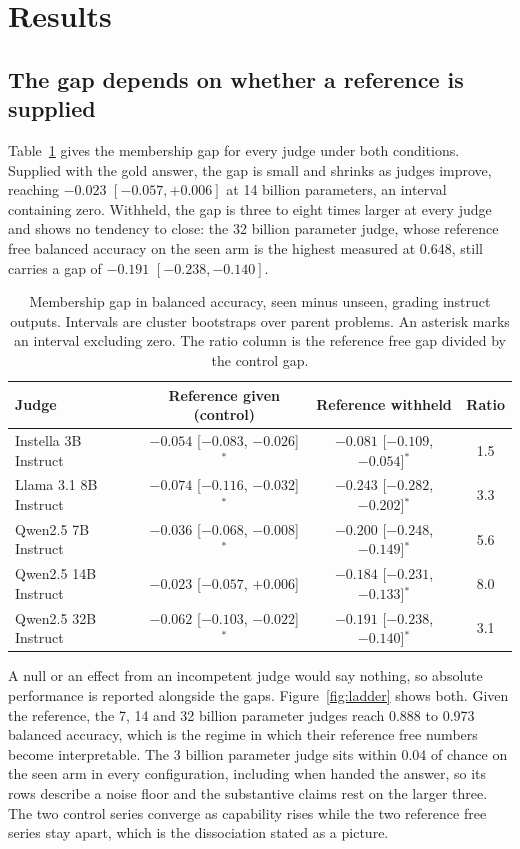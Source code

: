 \documentclass{article}
\begin{document}
\section{Results}

\subsection{The gap depends on whether a reference is supplied}

Table~\ref{tab:main} gives the membership gap for every judge under both conditions.
Supplied with the gold answer, the gap is small and shrinks as judges improve, reaching
$-0.023$ $[-0.057, +0.006]$ at 14 billion parameters, an interval containing zero. Withheld,
the gap is three to eight times larger at every judge and shows no tendency to close: the 32
billion parameter judge, whose reference free balanced accuracy on the seen arm is the
highest measured at 0.648, still carries a gap of $-0.191$ $[-0.238, -0.140]$.

\begin{table}[t]
\centering
\caption{Membership gap in balanced accuracy, seen minus unseen, grading instruct outputs.
Intervals are cluster bootstraps over parent problems. An asterisk marks an interval
excluding zero. The ratio column is the reference free gap divided by the control gap.}
\label{tab:main}
\small
\begin{tabular}{lccc}
\toprule
Judge & Reference given (control) & Reference withheld & Ratio \\
\midrule
Instella 3B Instruct  & $-0.054$ [$-0.083$, $-0.026$]$^{*}$ & $-0.081$ [$-0.109$, $-0.054$]$^{*}$ & 1.5 \\
Llama 3.1 8B Instruct & $-0.074$ [$-0.116$, $-0.032$]$^{*}$ & $\mathbf{-0.243}$ [$-0.282$, $-0.202$]$^{*}$ & 3.3 \\
Qwen2.5 7B Instruct   & $-0.036$ [$-0.068$, $-0.008$]$^{*}$ & $\mathbf{-0.200}$ [$-0.248$, $-0.149$]$^{*}$ & 5.6 \\
Qwen2.5 14B Instruct  & $-0.023$ [$-0.057$, $+0.006$]       & $\mathbf{-0.184}$ [$-0.231$, $-0.133$]$^{*}$ & 8.0 \\
Qwen2.5 32B Instruct  & $-0.062$ [$-0.103$, $-0.022$]$^{*}$ & $\mathbf{-0.191}$ [$-0.238$, $-0.140$]$^{*}$ & 3.1 \\
\bottomrule
\end{tabular}
\end{table}

A null or an effect from an incompetent judge would say nothing, so absolute performance is
reported alongside the gaps. Figure~\ref{fig:ladder} shows both. Given the reference, the 7,
14 and 32 billion parameter judges reach 0.888 to 0.973 balanced accuracy, which is the
regime in which their reference free numbers become interpretable. The 3 billion parameter
judge sits within 0.04 of chance on the seen arm in every configuration, including when
handed the answer, so its rows describe a noise floor and the substantive claims rest on the
larger three. The two control series converge as capability rises while the two reference
free series stay apart, which is the dissociation stated as a picture.
\end{document}
